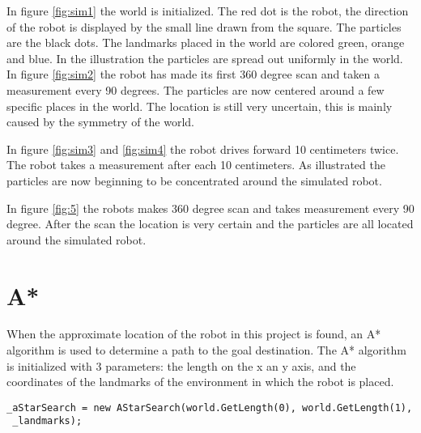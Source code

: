 In figure \ref{fig:sim1} the world is initialized. The red dot is the robot, the direction of the robot is displayed by the small line drawn from the square. The particles are the black dots. The landmarks placed in the world are colored green, orange and blue. In the illustration the particles are spread out uniformly in the world. In figure \ref{fig:sim2} the robot has made its first 360 degree scan and taken a measurement every 90 degrees. The particles are now centered around a few specific places in the world. The location is still very uncertain, this is mainly caused by the symmetry of the world.


In figure \ref{fig:sim3} and \ref{fig:sim4} the robot drives forward 10 centimeters twice. The robot takes a measurement after each 10 centimeters. As illustrated the particles are now beginning to be concentrated around the simulated robot.


\FloatBarrier
In figure \ref{fig:5} the robots makes 360 degree scan and takes measurement every 90 degree. After the scan the location is very certain and the particles are all located around the simulated robot.


\section{A*}
When the approximate location of the robot in this project is found, an A* algorithm is used to determine a path to the goal destination. The A* algorithm is initialized with 3 parameters: the length on the x an y axis, and the coordinates of the landmarks of the environment in which the robot is placed. 

\lstset{style=sharpc}
\begin{lstlisting}[caption={Initialization of the A* algorithm}, label=lst:Astar_init, mathescape=true]             
_aStarSearch = new AStarSearch(world.GetLength(0), world.GetLength(1),
 _landmarks);
\end{lstlisting}

